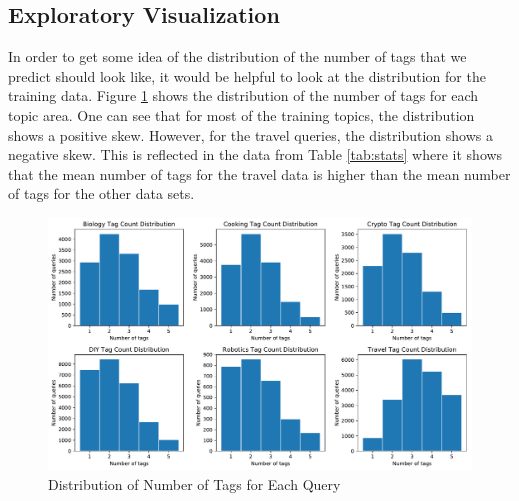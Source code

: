 \documentclass{article}
\begin{document}
\subsection{Exploratory Visualization}



In order to get some idea of the distribution of the number of tags that we
predict should look like, it would be helpful to look at the distribution for
the training data. Figure \ref{fig:TagCountDistribution} shows the
distribution of the number of tags for each topic area. One can see that for
most of the training topics, the distribution shows a positive skew. However,
for the travel queries, the  distribution shows a negative skew. This is
reflected in the data from Table \ref{tab:stats} where it shows that the mean
number of tags for the travel data is higher than the mean number of tags for
the other data sets. 

\begin{figure}[]
\includegraphics[width=\textwidth]{figures/TagCountDistribution.pdf}
\caption{Distribution of Number of Tags for Each Query}
\label{fig:TagCountDistribution}
\end{figure}
\end{document}
